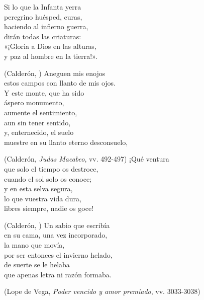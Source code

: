 \begin{exe}
	\ex\label{ex:sextilla}Si lo que la Infanta yerra\\
	peregrino huésped, curas,\\
	haciendo al infierno guerra,\\
	dirán todas las criaturas:\\
	«¡Gloria a Dios en las alturas,\\
	y paz al hombre en la tierra!».\\
	\strut\hfill(Calderón, )
	\ex\label{ex:sextetolira}Aneguen mis enojos\\
	estos campos con llanto de mis ojos.\\
		Y este monte, que ha sido\\
		áspero monumento,\\
		aumente el sentimiento,\\
		aun sin tener sentido,\\
		y, enternecido, el suelo\\
		muestre en su llanto eterno desconsuelo,\\
	\strut\hfill(Calderón, \textit{Judas Macabeo}, vv. 492-497\nocite{calderon_judasmacabeo})
	\ex\label{ex:coplapiequebrado} ¡Qué ventura\\
	que solo el tiempo os destroce,\\
	cuando el sol solo os conoce;\\
	y en esta selva segura,\\
	lo que vuestra vida dura,\\
	libres siempre, nadie os goce!\\	
	\strut\hfill(Calderón, )
	\ex\label{ex:estrofalirada}Un sabio que escribía\\
	en su cama, una vez incorporado,\\
		la mano que movía,\\
		por ser entonces el invierno helado,\\
		de suerte se le helaba\\
		que apenas letra ni razón formaba.\\
	\strut\hfill(Lope de Vega, \textit{Poder vencido y amor premiado}, vv. 3033-3038\nocite{vega_podervencido})
\end{exe}

